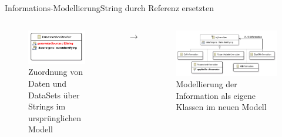 \documentclass{sdqbeamer}
\begin{document}
\begin{frame}{Informations-Modellierung}{String durch Referenz ersetzten}
	\begin{columns}
		\centering
		\begin{figure}
			\includegraphics[width=0.9\textwidth]{images/ParameterAndDataPair.pdf}
			\caption{Zuordnung von Daten und DataSets über Strings im ursprünglichen Modell}
		\end{figure}
		\centering
		\LARGE{$\rightarrow$}
		\centering
		\begin{figure}
			\includegraphics[width=\textwidth]{images/information.pdf}
			\caption{Modellierung der Information als eigene Klassen im neuen Modell}
		\end{figure}
	\end{columns}
\end{frame}
\end{document}
